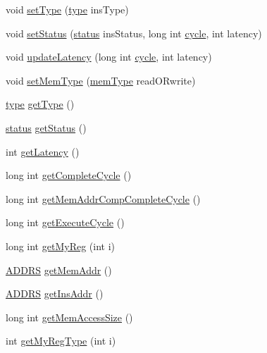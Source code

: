 \begin{DoxyCompactItemize}
void \hyperlink{classinstruction_ad9c7d979b5f4b00189973e47caa3411f}{setType} (\hyperlink{binaryTranslator_2global_8h_a7aead736a07eaf25623ad7bfa1f0ee2d}{type} insType)
\item 
void \hyperlink{classinstruction_ab4b1bbe98c775d3a1fab0ed281a4ad4f}{setStatus} (\hyperlink{global_2global_8h_a015eb90e0de9f16e87bd149d4b9ce959}{status} insStatus, long int \hyperlink{vliwScheduler_8cpp_a1f4871d45089b039d95d3832dd123827}{cycle}, int latency)
\item 
void \hyperlink{classinstruction_a818803cc54cb0b34c373ad6537976014}{updateLatency} (long int \hyperlink{vliwScheduler_8cpp_a1f4871d45089b039d95d3832dd123827}{cycle}, int latency)
\item 
void \hyperlink{classinstruction_a6c57d75878f06764457f4faaabe5de00}{setMemType} (\hyperlink{binaryTranslator_2global_8h_a94b8423a23b95a7adac22848b81e7c0c}{memType} readORwrite)
\item 
\hyperlink{binaryTranslator_2global_8h_a7aead736a07eaf25623ad7bfa1f0ee2d}{type} \hyperlink{classinstruction_a47623362d505a662b974624f81288389}{getType} ()
\item 
\hyperlink{global_2global_8h_a015eb90e0de9f16e87bd149d4b9ce959}{status} \hyperlink{classinstruction_ae93f7b1b0385897bb15fc795ee654c37}{getStatus} ()
\item 
int \hyperlink{classinstruction_a842fd50e52a3e3d31fcf8b7a180a32bd}{getLatency} ()
\item 
long int \hyperlink{classinstruction_a509352a63d4ffd931dd5a0a48f4451ba}{getCompleteCycle} ()
\item 
long int \hyperlink{classinstruction_af7c6a53cc4270140e47c885d51e55845}{getMemAddrCompCompleteCycle} ()
\item 
long int \hyperlink{classinstruction_a85915959a0db53205b721c2593941785}{getExecuteCycle} ()
\item 
long int \hyperlink{classinstruction_a6731a49c3bca293edf8fd1eb57fda995}{getMyReg} (int i)
\item 
\hyperlink{global_2global_8h_a7ea74bb9ffd2e4d41550ae2383dd25bc}{ADDRS} \hyperlink{classinstruction_a507811b2f10f679c90ac79ff64929272}{getMemAddr} ()
\item 
\hyperlink{global_2global_8h_a7ea74bb9ffd2e4d41550ae2383dd25bc}{ADDRS} \hyperlink{classinstruction_ac1fabe854c85726785052c7a5ebf6d39}{getInsAddr} ()
\item 
long int \hyperlink{classinstruction_a7811c2dd5418e30c53d2da2460e0d47c}{getMemAccessSize} ()
\item 
int \hyperlink{classinstruction_a0f74a2a6cca80ebc2286daa72e1dfbbd}{getMyRegType} (int i)

\end{DoxyCompactItemize}
